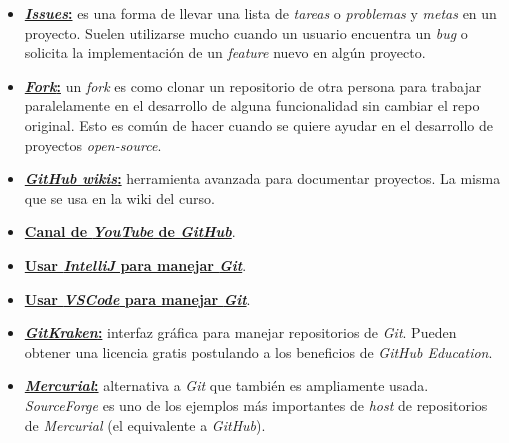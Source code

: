     \begin{itemize}
      \item \href{https://guides.github.com/features/issues/}{
        \textbf{\textit{Issues}:}} es una forma de llevar una lista de \textit{tareas}
        o \textit{problemas} y \textit{metas} en un proyecto.
        Suelen utilizarse mucho cuando un usuario encuentra un \textit{bug} o solicita
        la implementación de un \textit{feature} nuevo en algún proyecto.
      \item \href{https://guides.github.com/activities/forking/}{
        \textbf{\textit{Fork}:}} un \textit{fork} es como clonar un repositorio de 
        otra persona para trabajar paralelamente en el desarrollo de alguna 
        funcionalidad sin cambiar el repo original.
        Esto es común de hacer cuando se quiere ayudar en el desarrollo de proyectos 
        \textit{open-source}.
      \item \href{https://guides.github.com/features/wikis/}{
        \textbf{\textit{GitHub wikis}:}} herramienta avanzada para documentar 
        proyectos.
        La misma que se usa en la wiki del curso. 
      \item \href{https://www.youtube.com/githubguides}{\textbf{Canal de 
        \textit{YouTube} de \textit{GitHub}}}.
      \item \href{https://www.youtube.com/watch?v=uUzRMOCBorg}{\textbf{Usar 
        \textit{IntelliJ} para manejar \textit{Git}}}.
      \item  \href{https://code.visualstudio.com/docs/editor/versioncontrol}{
        \textbf{Usar \textit{VSCode} para manejar \textit{Git}}}.
      \item \href{https://www.gitkraken.com}{\textbf{\textit{GitKraken}:}} interfaz 
        gráfica para manejar repositorios de \textit{Git}.
        Pueden obtener una licencia gratis postulando a los beneficios de 
        \textit{GitHub Education}.
      \item \href{https://www.mercurial-scm.org}{\textbf{\textit{Mercurial}:}} 
        alternativa a \textit{Git} que también es ampliamente usada.
        \textit{SourceForge} es uno de los ejemplos más importantes de \textit{host} 
        de repositorios de \textit{Mercurial} (el equivalente a \textit{GitHub}).
    \end{itemize}
  \nocite{*}
  \printbibliography[keyword=git]
%